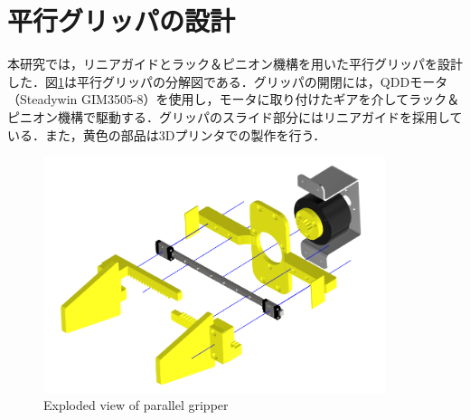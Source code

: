 \section{平行グリッパの設計}
本研究では，リニアガイドとラック＆ピニオン機構を用いた平行グリッパを設計した．図\ref{fig:hand}は平行グリッパの分解図である．グリッパの開閉には，QDDモータ（Steadywin GIM3505-8）を使用し，モータに取り付けたギアを介してラック＆ピニオン機構で駆動する．グリッパのスライド部分にはリニアガイドを採用している．また，黄色の部品は3Dプリンタでの製作を行う．
\begin{figure}[htbp]
  \centering
  \includegraphics[width=10cm]{images/design/hand.png}
  \caption{Exploded view of parallel gripper}
  \label{fig:hand}
\end{figure}

\newpage